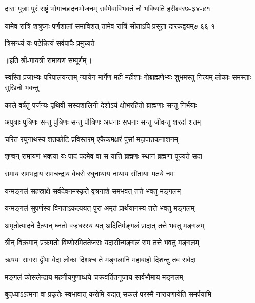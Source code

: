 \annotwolineshloka
{दाराः पुत्राः पुरं राष्ट्रं भोगाच्छादनभोजनम्}
{सर्वमेवाविभक्तं नौ भविष्यति हरीश्वर}{७-३४-४१}

\annotwolineshloka
{यामेव रात्रिं शत्रुघ्नः पर्णशालां समाविशत्}
{तामेव रात्रिं सीताऽपि प्रसूता दारकद्वयम्}{७-६६-१}

{त्रिसन्ध्यं यः पठेन्नित्यं सर्वपापैः प्रमुच्यते}

॥इति श्री-गायत्री रामायणं सम्पूर्णम्॥

\resetShloka
\fourlineindentedshloka
{स्वस्ति प्रजाभ्यः परिपालयन्ताम्}
{न्यायेन मार्गेण महीं महीशाः}
{गोब्राह्मणेभ्यः शुभमस्तु नित्यम्}
{लोकाः समस्ताः सुखिनो भवन्तु}

\twolineshloka
{काले वर्षतु पर्जन्यः पृथिवी सस्यशालिनी}
{देशोऽयं क्षोभरहितो ब्राह्मणाः सन्तु निर्भयाः}

\twolineshloka
{अपुत्राः पुत्रिणः सन्तु पुत्रिणः सन्तु पौत्रिणः}
{अधनाः सधनाः सन्तु जीवन्तु शरदां शतम्}

\twolineshloka
{चरितं रघुनाथस्य शतकोटि-प्रविस्तरम्}
{एकैकमक्षरं पुंसां महापातकनाशनम्}

\twolineshloka
{शृण्वन् रामायणं भक्त्या यः पादं पदमेव वा}
{स याति ब्रह्मणः स्थानं ब्रह्मणा पूज्यते सदा}

\twolineshloka
{रामाय रामभद्राय रामचन्द्राय वेधसे}
{रघुनाथाय नाथाय सीतायाः पतये नमः}

\twolineshloka
{यन्मङ्गलं सहस्राक्षे सर्वदेवनमस्कृते}
{वृत्रनाशे समभवत् तत्ते भवतु मङ्गलम्}

\twolineshloka
{यन्मङ्गलं सुपर्णस्य विनताऽकल्पयत् पुरा}
{अमृतं प्रार्थयानस्य तत्ते भवतु मङ्गलम्}

\twolineshloka
{अमृतोत्पादने दैत्यान् घ्नतो वज्रधरस्य यत्}
{अदितिर्मङ्गलं प्रादात् तत्ते भवतु मङ्गलम्}

\twolineshloka
{त्रीन् विक्रमान् प्रक्रमतो विष्णोरमिततेजसः}
{यदासीन्मङ्गलं राम तत्ते भवतु मङ्गलम्}

\twolineshloka
{ऋषयः सागरा द्वीपा वेदा लोका दिशश्च ते}
{मङ्गलानि महाबाहो दिशन्तु तव सर्वदा}

\twolineshloka
{मङ्गलं कोसलेन्द्राय महनीयगुणाब्धये}
{चक्रवर्तितनूजाय सार्वभौमाय मङ्गलम्}

{बुद्‌ध्याऽऽत्मना वा प्रकृतेः स्वभावात्}
{करोमि यद्यत् सकलं परस्मै}
{नारायणायेति समर्पयामि}
